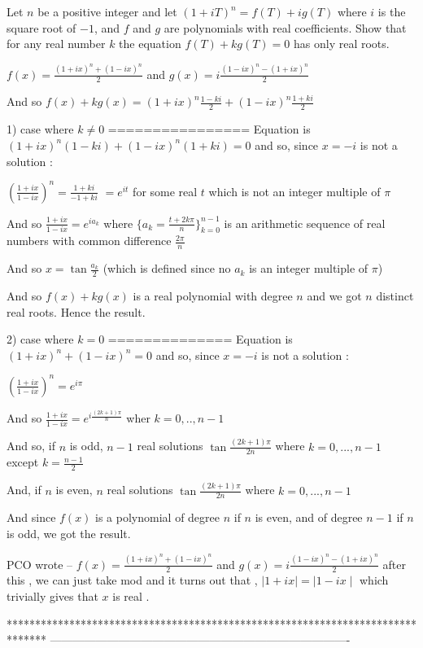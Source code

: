\begin{solution}
	\begin{tcolorbox}Let $n$ be a positive integer and let $(1+iT)^n=f(T)+ig(T)$ where $i$ is the square root of $-1$, and $f$ and $g$ are polynomials with real coefficients. Show that for any real number $k$ the equation $f(T)+kg(T)=0$ has only real roots.\end{tcolorbox}
$f(x)=\frac{(1+ix)^n+(1-ix)^n}2$ and $g(x)=i\frac{(1-ix)^n-(1+ix)^n}2$

And so $f(x)+kg(x)=(1+ix)^n\frac{1-ki}2+(1-ix)^n\frac{1+ki}2$

1) case where $k\ne 0$ 
================
Equation is $(1+ix)^n(1-ki)+(1-ix)^n(1+ki)=0$ and so, since $x=-i$ is not a solution :

$\left(\frac{1+ix}{1-ix}\right)^n=\frac{1+ki}{-1+ki}$ $=e^{it}$ for some real $t$ which is not an integer multiple of $\pi$

And so $\frac{1+ix}{1-ix}=e^{ia_k}$ where $\{a_k=\frac{t+2k\pi}n\}_{k=0}^{n-1}$ is an arithmetic sequence of real numbers with common difference $\frac{2\pi}n$ 

And so $x=\tan\frac{a_k}2$ (which is defined since no $a_k$ is an integer multiple of $\pi$)

And so $f(x)+kg(x)$ is a real polynomial with degree $n$ and we got $n$ distinct real roots.
Hence the result.

2) case where $k=0$
==============
Equation is $(1+ix)^n+(1-ix)^n=0$ and so, since $x=-i$ is not a solution :

$\left(\frac{1+ix}{1-ix}\right)^n=e^{i\pi}$

And so $\frac{1+ix}{1-ix}=e^{i\frac{(2k+1)\pi}n}$ wher $k=0,..,n-1$

And so, if $n$ is odd, $n-1$ real solutions $\tan \frac{(2k+1)\pi}{2n}$ where $k=0,...,n-1$ except $k=\frac{n-1}2$

And, if $n$ is even, $n$ real solutions $\tan \frac{(2k+1)\pi}{2n}$ where $k=0,...,n-1$

And since $f(x)$ is a polynomial of degree $n$ if $n$ is even, and of degree $n-1$ if $n$ is odd, we got the result.
\end{solution}



\begin{solution}
	PCO wrote -- $f(x)=\frac{(1+ix)^n+(1-ix)^n}2$ and $g(x)=i\frac{(1-ix)^n-(1+ix)^n}2$
after this , we can just take mod and it turns out that ,
$\mid 1+ix \mid =\mid 1-ix \mid$ which trivially gives that $x$ is real .
\end{solution}
*******************************************************************************
-------------------------------------------------------------------------------

